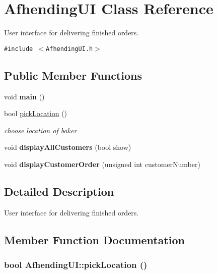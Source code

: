 \hypertarget{class_afhending_u_i}{
\section{Afhending\-UI Class Reference}
\label{class_afhending_u_i}
}
User interface for delivering finished orders.  


{\tt \#include $<$Afhending\-UI.h$>$}

\subsection*{Public Member Functions}
\begin{CompactItemize}
\item 
\hypertarget{class_afhending_u_i_ea83b916b3f52eec32ae6d54d59b4453}{
void {\bf main} ()}
\label{class_afhending_u_i_ea83b916b3f52eec32ae6d54d59b4453}

\item 
bool \hyperlink{class_afhending_u_i_74d0d6b7d7493e8a9703bc8fbeb79f2e}{pick\-Location} ()
\begin{CompactList}\small\item\em choose location of baker \item\end{CompactList}\item 
\hypertarget{class_afhending_u_i_388ec3e6c0999970759fa9fdcacda10e}{
void {\bf display\-All\-Customers} (bool show)}
\label{class_afhending_u_i_388ec3e6c0999970759fa9fdcacda10e}

\item 
\hypertarget{class_afhending_u_i_537283a7f7677384872f66c6b1dc4491}{
void {\bf display\-Customer\-Order} (unsigned int customer\-Number)}
\label{class_afhending_u_i_537283a7f7677384872f66c6b1dc4491}

\end{CompactItemize}


\subsection{Detailed Description}
User interface for delivering finished orders. 



\subsection{Member Function Documentation}
\hypertarget{class_afhending_u_i_74d0d6b7d7493e8a9703bc8fbeb79f2e}{
\subsubsection[pickLocation]{\setlength{\rightskip}{0pt plus 5cm}bool Afhending\-UI::pick\-Location ()}}
\label{class_afhending_u_i_74d0d6b7d7493e8a9703bc8fbeb79f2e}


